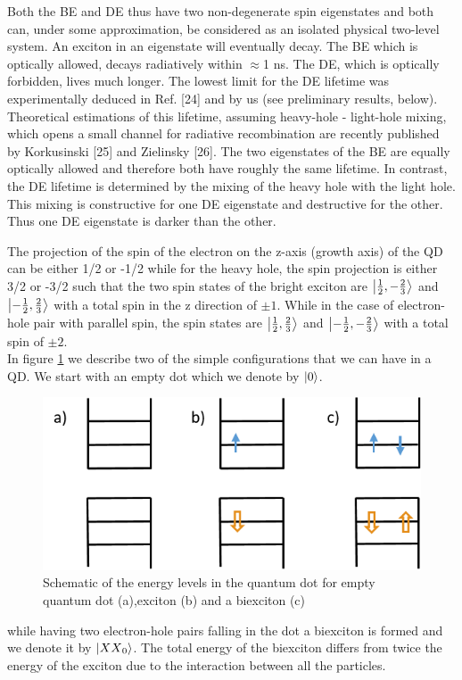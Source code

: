 Both the BE and DE thus have two non-degenerate spin eigenstates and both can, under some approximation, be considered as an isolated physical two-level system. An exciton in an eigenstate will eventually decay. The BE which is optically allowed, decays radiatively within $\approx$1 ns.
The DE, which is optically forbidden, lives much longer. The lowest limit for the DE lifetime was experimentally deduced in Ref. [24] and by us (see preliminary results, below). Theoretical estimations of this lifetime, assuming heavy-hole - light-hole mixing, which opens a small channel for radiative recombination are recently published by Korkusinski [25] and Zielinsky [26]. The two eigenstates of the BE are equally optically allowed and therefore both have roughly the same
lifetime. In contrast, the DE lifetime is determined by the mixing of the heavy
hole with the light hole. This mixing is constructive for one DE eigenstate and
destructive for the other. Thus one DE eigenstate is darker than the other.

	The projection of the spin of the electron on the z-axis (growth axis) of the QD can be either 1/2 or -1/2 while for the heavy hole, the spin 
 projection is either 3/2 or -3/2 such that the two spin states of the bright exciton are $\ket{\frac{1}{2},-\frac{2}{3}}$ and $\ket{-\frac{1}
 {2},\frac{2}{3}}$  with a total spin in the z direction  of $\pm1$. While in the case of electron-hole pair with parallel spin, the spin states are $\ket{\frac{1}{2},\frac{2}{3}}$ and $\ket{-\frac{1}{2},-\frac{2}{3}}$ with a total spin of $\pm2$.\\
	In figure \ref{fig:energy_levels} we describe two of the simple configurations that we can have in a QD. We start with an empty dot which we denote by $\ket{0}$.
	\begin{figure}[H]
		\centering
		\includegraphics[scale=1]{figures/energy-levels.png}
		\caption{Schematic of the energy levels in the quantum dot for empty quantum dot (a),exciton (b) and a biexciton (c)}
		\label{fig:energy_levels}
	\end{figure}
	while having two electron-hole pairs falling in the dot a biexciton is formed and we denote it by $\ket{{XX}_0}$. The total energy of the biexciton differs from twice the energy of the exciton due to the interaction between all the particles.\\
	
